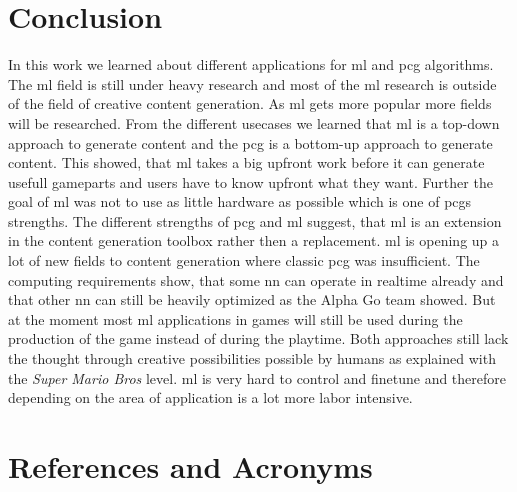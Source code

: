 \documentclass[10pt,a4paper]{article}
\begin{document}
\section{Conclusion}
In this work we learned about different applications for \gls{ml} and \gls{pcg} algorithms. The \gls{ml} field is still under heavy research and most of the \gls{ml} research is outside of the field of creative content generation. As \gls{ml} gets more popular more fields will be researched. From the different usecases we learned that \gls{ml} is a top-down approach to generate content and the \gls{pcg} is a bottom-up approach to generate content. This showed, that \gls{ml} takes a big upfront work before it can generate usefull gameparts and users have to know upfront what they want. Further the goal of \gls{ml} was not to use as little hardware as possible which is one of \gls{pcg}s strengths. The different strengths of \gls{pcg} and \gls{ml} suggest, that \gls{ml} is an extension in the content generation toolbox rather then a replacement. \gls{ml} is opening up a lot of new fields to content generation where classic \gls{pcg} was insufficient. The computing requirements show, that some \gls{nn} can operate in realtime already and that other \gls{nn} can still be heavily optimized as the Alpha Go team showed. But at the moment most \gls{ml} applications in games will still be used during the production of the game instead of during the playtime. Both approaches still lack the thought through creative possibilities possible by humans as explained with the \textit{Super Mario Bros} level. \gls{ml} is very hard to control and finetune and therefore depending on the area of application is a lot more labor intensive.

\section{References and Acronyms}

\printglossaries


%
%

%


\listoffigures
\listoftables

\end{document}
